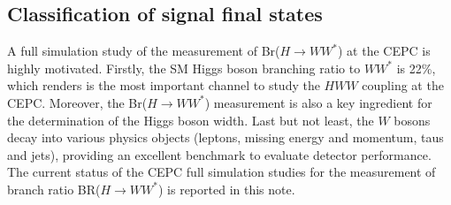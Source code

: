 \documentclass[11pt,a4paper]{cepcnote}
\begin{document}
\subsection{Classification of signal final states}
A full simulation study of the measurement of Br($H\rightarrow WW^*$) at the CEPC is highly motivated. Firstly, 
the SM Higgs boson branching ratio to $WW^*$ is 22\%, which renders is the most important channel 
to study the $HWW$ coupling at the CEPC. Moreover, the Br($H\rightarrow WW^*$) measurement is also 
a key ingredient for the determination of the Higgs boson width. Last but not least, the $W$ bosons decay into various physics 
objects (leptons, missing energy and momentum, taus and jets), providing an excellent benchmark to evaluate detector 
performance. The current status of the CEPC full simulation studies for the measurement of branch ratio BR($H\rightarrow WW^*$)
is reported in this note. 
\end{document}
